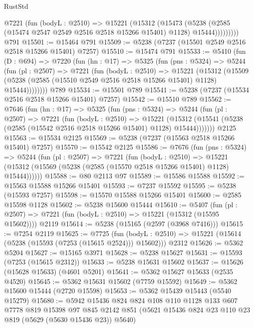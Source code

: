 \begin{lexlean}{RustStd}
\begin{coremodule}
            @7221
              (fun (bodyL : @2510) =>
              @15221
                (@15312
                  (@15473
                    (@5238
                      (@2585 (@15474 @2547 @2549 @2516 @2518 @15266 @15401) @1128)
                      @15444)))))))))
    @791
@15501 := @15464 @791
@15509 := @5238 (@7237 (@15501 @2549 @2516 @2518 @15266 @15401) @7257)
@15510 := @15474 @791
@15533 := @5410
    (fun (D : @694) =>
    @7220
      (fun (hn : @17) =>
      @5325
        (fun (pns : @5324) =>
        @5244
          (fun (pl : @2507) =>
          @7221
            (fun (bodyL : @2510) =>
            @15221
              (@15312
                (@15509 (@5238 (@2585 (@15510 @2549 @2516 @2518 @15266 @15401) @1128) @15444))))))))
    @789
@15534 := @15501 @789
@15541 := @5238 (@7237 (@15534 @2516 @2518 @15266 @15401) @7257)
@15542 := @15510 @789
@15562 := @7646
    (fun (hn : @17) =>
    @5325
      (fun (pns : @5324) =>
      @5244
        (fun (pl : @2507) =>
        @7221
          (fun (bodyL : @2510) =>
          @15221
            (@15312 (@15541 (@5238 (@2585 (@15542 @2516 @2518 @15266 @15401) @1128) @15444)))))))
    @2125
@15563 := @15534 @2125
@15569 := @5238 (@7237 (@15563 @2518 @15266 @15401) @7257)
@15570 := @15542 @2125
@15586 := @7676
    (fun (pns : @5324) =>
    @5244
      (fun (pl : @2507) =>
      @7221
        (fun (bodyL : @2510) =>
        @15221 (@15312 (@15569 (@5238 (@2585 (@15570 @2518 @15266 @15401) @1128) @15444))))))
@15588 := @80 @2113 @97
@15589 := @15586 @15588
@15592 := @15563 @15588 @15266 @15401
@15593 := @7237 @15592
@15595 := @5238 (@15593 @7257)
@15598 := @15570 @15588 @15266 @15401
@15600 := @2585 @15598 @1128
@15602 := @5238 @15600 @15444
@15610 := @5407
    (fun (pl : @2507) => @7221 (fun (bodyL : @2510) => @15221 (@15312 (@15595 @15602))))
    @2119
@15614 := @5238 (@15165 (@2597 (@3968 @7416)))
@15615 := @7254 @2119
@15625 := @7725
    (fun (bodyL : @2510) => @15221 (@15614 (@5238 (@15593 (@7253 (@15615 @2524))) @15602)))
    @2312
@15626 := @5362 @5204
@15627 := @15165 @3971
@15628 := @5238 @15627
@15631 := @15593 (@7253 (@15615 @2312))
@15633 := @5238 @15631 @15602
@15637 := @15626 (@15628 @15633) (@4601 @5201)
@15641 := @5362 @15627 @15633 (@2535 @4520)
@15645 := @5362 @15631 @15602 (@7759 @15592)
@15649 := @5362 @15600 @15444 (@2720 @15598)
@15653 := @5362 @15439 @15443 (@5540 @15279)
@15680 := @5942
    @15436
    @824
    @824
    @108
    @110
    @1128
    @133
    @607
    @7778
    @819
    @15398
    @97
    @845
    @2142
    @851
    (@5621 @15436 @824 @23 @110 @23 @819 (@5629 (@5630 @15436 @23)) @5640)

\end{coremodule}
\end{lexlean}
